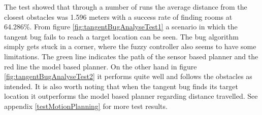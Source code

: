 \documentclass[../Head/Main.tex]{subfiles}
\begin{document}
The test showed that through a number of runs the average distance from the closest obstacles was 1.596 meters with a success rate of finding rooms at 64.286\%. From figure \ref{fig:tangentBugAnalyseTest1} a scenario in which the tangent bug fails to reach a target location can be seen. The bug algorithm simply gets stuck in a corner, where the fuzzy controller also seems to have some limitations. The green line indicates the path of the sensor based planner and the red line the model based planner. On the other hand in figure \ref{fig:tangentBugAnalyseTest2} it performs quite well and follows the obstacles as intended. It is also worth noting that when the tangent bug finds its target location it outperforms the model based planner regarding distance travelled. See appendix \ref{testMotionPlanning} for more test results. 
 
\end{document}
